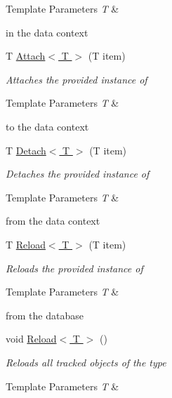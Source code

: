 \begin{DoxyCompactItemize}
\begin{DoxyCompactList}
\begin{DoxyTemplParams}{Template Parameters}
{\em T} & \\
\hline
\end{DoxyTemplParams}
in the data context \end{DoxyCompactList}\item 
T \hyperlink{interface_framework_extension_1_1_core_1_1_interfaces_1_1_i_data_context_afb8535c9b4c824dcc7787ee1c8f987e8}{Attach$<$ T $>$} (T item)
\begin{DoxyCompactList}\small\item\em Attaches the provided instance of 
\begin{DoxyTemplParams}{Template Parameters}
{\em T} & \\
\hline
\end{DoxyTemplParams}
to the data context \end{DoxyCompactList}\item 
T \hyperlink{interface_framework_extension_1_1_core_1_1_interfaces_1_1_i_data_context_a26dc0d9a711b046a891f4796774a868f}{Detach$<$ T $>$} (T item)
\begin{DoxyCompactList}\small\item\em Detaches the provided instance of 
\begin{DoxyTemplParams}{Template Parameters}
{\em T} & \\
\hline
\end{DoxyTemplParams}
from the data context \end{DoxyCompactList}\item 
T \hyperlink{interface_framework_extension_1_1_core_1_1_interfaces_1_1_i_data_context_a0440afc85c29fbe35b62685a08fb2313}{Reload$<$ T $>$} (T item)
\begin{DoxyCompactList}\small\item\em Reloads the provided instance of 
\begin{DoxyTemplParams}{Template Parameters}
{\em T} & \\
\hline
\end{DoxyTemplParams}
from the database \end{DoxyCompactList}\item 
void \hyperlink{interface_framework_extension_1_1_core_1_1_interfaces_1_1_i_data_context_a0085fcdb37363f377d7ae84522e53a5b}{Reload$<$ T $>$} ()
\begin{DoxyCompactList}\small\item\em Reloads all tracked objects of the type 
\begin{DoxyTemplParams}{Template Parameters}
{\em T} & \\
\hline

\end{DoxyTemplParams}
\end{DoxyCompactList}
\end{DoxyCompactItemize}
